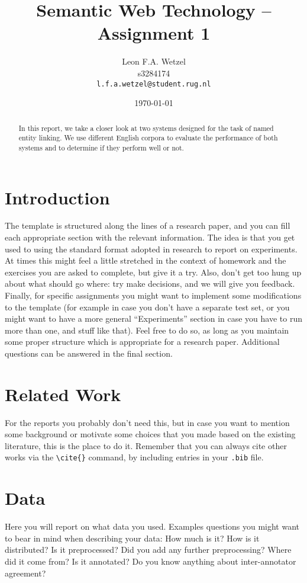 \documentclass[11pt]{article}
\title{Semantic Web Technology -- Assignment 1}
\author{Leon F.A. Wetzel \\
  s3284174 \\
  {\tt l.f.a.wetzel@student.rug.nl}}
\date{\today}
\begin{document}
\maketitle
\begin{abstract}
In this report, we take a closer look at two systems designed for the task of named entity linking. We use different English corpora to evaluate the performance of both systems and to determine if they perform well or not.
 \end{abstract}


\section{Introduction}

 The template is structured along the lines of a research paper, and you can fill each appropriate section with the relevant information. The idea is that you get used to using the standard format adopted in research to report on experiments. At times this might feel a little stretched in the context of homework and the exercises you are asked to complete, but give it a try. Also, don't get too hung up about what should go where: try make decisions, and we will give you feedback. Finally, for specific assignments you might want to implement some modifications to the template (for example in case you don't have a separate test set, or you might want to have a more general ``Experiments'' section in case you have to run more than one, and stuff like that). Feel free to do so, as long as you maintain some proper structure which is appropriate for a research paper. Additional questions can be answered in the final section.

\section{Related Work}

For the reports you probably don't need this, but in case you want to mention some background or motivate some choices that you made based on the existing literature, this is the place to do it. Remember that you can always cite other works via the \verb!\cite{}! command, by including entries in your \verb!.bib! file. 

\section{Data}

Here you will report on what data you used.  Examples questions you might want to bear in mind when describing your data: How much is it? How is it distributed? Is it preprocessed? Did you add any further preprocessing? Where did it come from? Is it annotated? Do you know anything about inter-annotator agreement?
\end{document}

